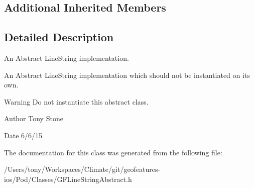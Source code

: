 \subsection*{Additional Inherited Members}


\subsection{Detailed Description}
An Abstract Line\+String implementation. 

An Abstract Line\+String implementation which should not be instantiated on it\textquotesingle{}s own.

\begin{DoxyWarning}{Warning}
Do not instantiate this abstract class.
\end{DoxyWarning}
\begin{DoxyAuthor}{Author}
Tony Stone 
\end{DoxyAuthor}
\begin{DoxyDate}{Date}
6/6/15 
\end{DoxyDate}


The documentation for this class was generated from the following file\+:\begin{DoxyCompactItemize}
\item 
/\+Users/tony/\+Workspaces/\+Climate/git/geofeatures-\/ios/\+Pod/\+Classes/G\+F\+Line\+String\+Abstract.\+h\end{DoxyCompactItemize}
